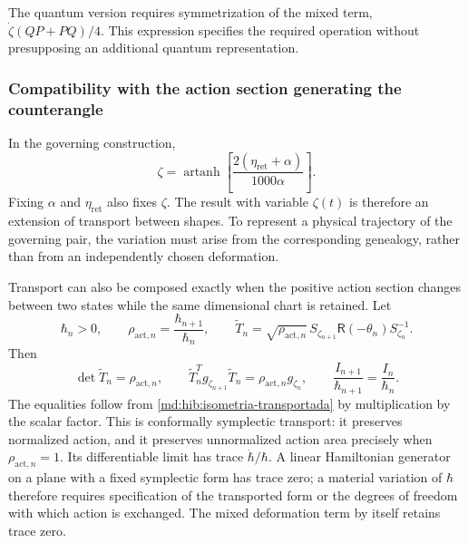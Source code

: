 The quantum version requires symmetrization of the mixed term,
$\dot\zeta(QP+PQ)/4$. This expression specifies the required operation
without presupposing an additional quantum representation.

\subsubsection{Compatibility with the action section generating the counterangle}
\label{md:hib:compatibilidad-accion}

In the governing construction,
\begin{equation}
 \zeta=\operatorname{artanh}
 \left[\frac{2(\eta_{\mathrm{ret}}+\alpha)}{1000\alpha}\right].
 \label{md:hib:forma-genealogica}
\end{equation}
Fixing $\alpha$ and $\eta_{\mathrm{ret}}$ also fixes $\zeta$.
The result with variable $\zeta(t)$ is therefore an extension of
transport between shapes. To represent a physical trajectory of the
governing pair, the variation must arise from the corresponding genealogy,
rather than from an independently chosen deformation.

Transport can also be composed exactly when the positive action section
changes between two states while the same dimensional chart is retained.
Let
\begin{equation}
 \hbar_n>0,\qquad
 \rho_{\mathrm{act},n}=\frac{\hbar_{n+1}}{\hbar_n},\qquad
 \widetilde T_n=\sqrt{\rho_{\mathrm{act},n}}\,
 S_{\zeta_{n+1}}\mathsf R(-\theta_n)S_{\zeta_n}^{-1}.
 \label{md:hib:transporte-conforme}
\end{equation}
Then
\begin{equation}
 \det\widetilde T_n=\rho_{\mathrm{act},n},\qquad
 \widetilde T_n^Tg_{\zeta_{n+1}}\widetilde T_n
 =\rho_{\mathrm{act},n}g_{\zeta_n},\qquad
 \frac{I_{n+1}}{\hbar_{n+1}}=\frac{I_n}{\hbar_n}.
 \label{md:hib:accion-normalizada}
\end{equation}
The equalities follow from \eqref{md:hib:isometria-transportada} by
multiplication by the scalar factor. This is conformally symplectic
transport: it preserves normalized action, and it preserves unnormalized
action area precisely when $\rho_{\mathrm{act},n}=1$.
Its differentiable limit has trace $\dot\hbar/\hbar$. A linear Hamiltonian
generator on a plane with a fixed symplectic form has trace zero;
a material variation of $\hbar$ therefore requires specification of the
transported form or the degrees of freedom with which action is exchanged.
The mixed deformation term by itself retains trace zero.


